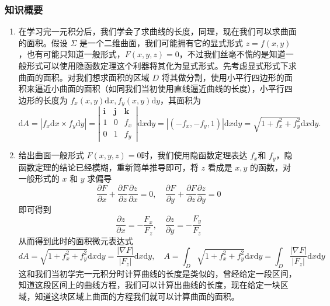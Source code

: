 \subsubsection{知识概要}
\begin{enumerate}
    \item 在学习完一元积分后，我们学会了求曲线的长度，同理，现在我们可以求曲面的面积。假设 $\Sigma$ 是一个二维曲面，我们可能拥有它的显式形式 $z = f(x,y)$，也有可能只知道一般形式，$F(x,y,z)=0$，不过我们丝毫不慌的是知道一般形式可以使用隐函数定理这个利器将其化为显式形式。先考虑显式形式下求曲面的面积。对我们想求面积的区域 $D$ 将其做分割，使用小平行四边形的面积来逼近小曲面的面积（如同我们当初使用直线逼近曲线的长度），小平行四边形的长度为 $f_x(x,y) \mathrm{d}x , f_y(x,y) \mathrm{d}y$，其面积为
    $$
    \mathrm{d}A = |f_x \mathrm{d}x \times f_y \mathrm{d}y| = \left|\begin{array}{ccc}\mathbf{i}&\mathbf{j}&\mathbf{k}\\1&0&f_x\\0&1&f_y\end{array}\right|\mathrm{d}x\mathrm{d}y=|(-f_x,-f_y,1)|\mathrm{d}x\mathrm{d}y=\sqrt{1+f_x^2+f_y^2}\mathrm{d}x\mathrm{d}y.
    $$

    \item 给出曲面一般形式 $F(x,y,z)=0$时，我们使用隐函数定理表达 $f_x$和 $f_y$，隐函数定理的结论已经模糊，重新简单推导即可，将 $z$ 看成是 $x,y$ 的函数，对一般形式的 $x$ 和 $y$ 求偏导
    $$
    \frac{\partial F}{\partial x} + \frac{\partial F}{\partial z}\frac{\partial z}{\partial x} = 0 , \quad \frac{\partial F}{\partial y} + \frac{\partial F}{\partial z}\frac{\partial z}{\partial y} = 0 
    $$
    即可得到
    $$
    \frac{\partial z}{\partial x} = - \frac{F_x}{F_z}, \quad \frac{\partial z}{\partial y} = - \frac{F_y}{F_z}
    $$
    从而得到此时的面积微元表达式
    $$
    dA=\sqrt{1+f_x^2+f_y^2}\mathrm{d}x\mathrm{d}y=\frac{|\nabla F|}{|F_z|}\mathrm{d}x\mathrm{d}y, \quad A=\int_D\sqrt{1+f_x^2+f_y^2}\mathrm{d}x\mathrm{d}y=\int_D\frac{|\nabla F|}{|F_z|}\mathrm{d}x\mathrm{d}y
    $$
    这和我们当初学完一元积分时计算曲线的长度是类似的，曾经给定一段区间，知道这段区间上的曲线方程，我们可以计算出曲线的长度，现在给定一块区域，知道这块区域上曲面的方程我们就可以计算曲面的面积。


\end{enumerate}
